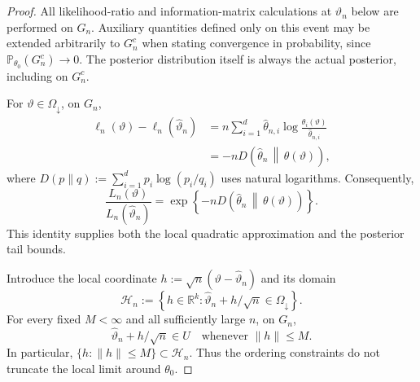 \documentclass[10pt,a4paper]{amsart}
\theoremstyle{named}
\theoremstyle{named1}
\theoremstyle{plain}
\theoremstyle{remark}
\begin{document}
\begin{proof}
All likelihood-ratio and information-matrix calculations at
$\widehat\vartheta_n$ below are performed on $G_n$. Auxiliary quantities
defined only on this event may be extended arbitrarily to $G_n^c$ when
stating convergence in probability, since
$\mathbb P_{\theta_0}(G_n^c)\to0$. The posterior distribution itself is
always the actual posterior, including on $G_n^c$.

For $\vartheta\in\Omega_{\downarrow}$, on $G_n$,
\[
\begin{aligned}
    \ell_n(\vartheta)-\ell_n(\widehat\vartheta_n)
    &=
    n\sum_{i=1}^d\widehat\theta_{n,i}
    \log\frac{\theta_i(\vartheta)}{\widehat\theta_{n,i}}\\
    &=-nD\!\left(
        \widehat\theta_n\,\middle\|\,\theta(\vartheta)
    \right),
\end{aligned}
\]
where $D(p\|q):=\sum_{i=1}^dp_i\log(p_i/q_i)$ uses natural logarithms.
Consequently,
\begin{equation}
    \frac{L_n(\vartheta)}{L_n(\widehat\vartheta_n)}
    =
    \exp\left\{
        -nD\!\left(
            \widehat\theta_n\,\middle\|\,\theta(\vartheta)
        \right)
    \right\}.
    \label{eq:likelihood-kl}
\end{equation}
This identity supplies both the local quadratic approximation and the
posterior tail bounds.

Introduce the local coordinate
$h:=\sqrt n(\vartheta-\widehat\vartheta_n)$ and its domain
\[
    \mathcal H_n
    :=
    \left\{
        h\in\mathbb R^k:
        \widehat\vartheta_n+h/\sqrt n\in\Omega_{\downarrow}
    \right\}.
\]
For every fixed $M<\infty$ and all sufficiently large $n$, on $G_n$,
\[
    \widehat\vartheta_n+h/\sqrt n\in U
    \quad\text{whenever }\|h\|\leq M.
\]
In particular, $\{h:\|h\|\leq M\}\subset\mathcal H_n$. Thus the
ordering constraints do not truncate the local limit around $\theta_0$.


\end{proof}
\end{document}
